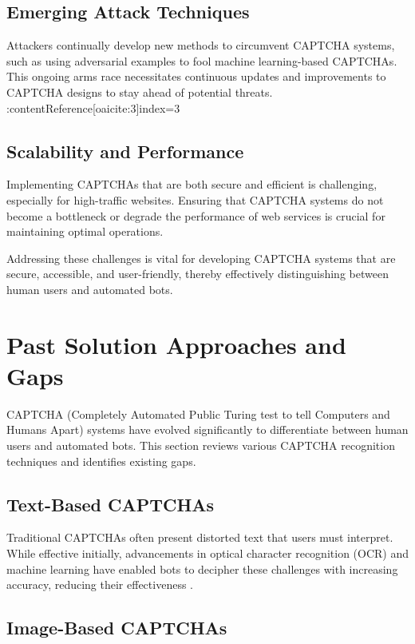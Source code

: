 \documentclass[sigconf]{acmart}
\begin{document}
\subsection{Emerging Attack Techniques}
Attackers continually develop new methods to circumvent CAPTCHA systems, such as using adversarial examples to fool machine learning-based CAPTCHAs. This ongoing arms race necessitates continuous updates and improvements to CAPTCHA designs to stay ahead of potential threats. :contentReference[oaicite:3]{index=3}

\subsection{Scalability and Performance}
Implementing CAPTCHAs that are both secure and efficient is challenging, especially for high-traffic websites. Ensuring that CAPTCHA systems do not become a bottleneck or degrade the performance of web services is crucial for maintaining optimal operations.

Addressing these challenges is vital for developing CAPTCHA systems that are secure, accessible, and user-friendly, thereby effectively distinguishing between human users and automated bots.

\section{Past Solution Approaches and Gaps}

CAPTCHA (Completely Automated Public Turing test to tell Computers and Humans Apart) systems have evolved significantly to differentiate between human users and automated bots. This section reviews various CAPTCHA recognition techniques and identifies existing gaps.

\subsection{Text-Based CAPTCHAs}

Traditional CAPTCHAs often present distorted text that users must interpret. While effective initially, advancements in optical character recognition (OCR) and machine learning have enabled bots to decipher these challenges with increasing accuracy, reducing their effectiveness \cite{proxidize2023captcha}.

\subsection{Image-Based CAPTCHAs}
\end{document}
